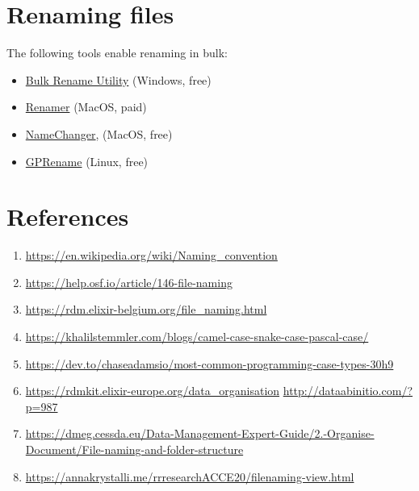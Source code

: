 \documentclass[
  letterpaper,
  DIV=11,
  numbers=noendperiod]{scrreprt}
\providecommand{\tightlist}{%
  \setlength{\itemsep}{0pt}\setlength{\parskip}{0pt}}\usepackage{longtable,booktabs,array}
\begin{document}
\hypertarget{renaming-files}{%
\section*{Renaming files}\label{renaming-files}}


The following tools enable renaming in bulk:

\begin{itemize}
\tightlist
\item
  \href{https://www.bulkrenameutility.co.uk/}{Bulk Rename Utility}
  (Windows, free)
\item
  \href{https://renamer.com/}{Renamer} (MacOS, paid)
\item
  \href{https://mrrsoftware.com/namechanger/}{NameChanger}, (MacOS,
  free)
\item
  \href{https://gprename.sourceforge.net/}{GPRename} (Linux, free)
\end{itemize}

\hypertarget{references-1}{%
\section*{References}\label{references-1}}


\begin{enumerate}
\def\labelenumi{\arabic{enumi}.}
\tightlist
\item
  \url{https://en.wikipedia.org/wiki/Naming_convention}
\item
  \url{https://help.osf.io/article/146-file-naming}
\item
  \url{https://rdm.elixir-belgium.org/file_naming.html}
\item
  \url{https://khalilstemmler.com/blogs/camel-case-snake-case-pascal-case/}
\item
  \url{https://dev.to/chaseadamsio/most-common-programming-case-types-30h9}
\item
  \url{https://rdmkit.elixir-europe.org/data_organisation}
  \url{http://dataabinitio.com/?p=987}
\item
  \url{https://dmeg.cessda.eu/Data-Management-Expert-Guide/2.-Organise-Document/File-naming-and-folder-structure}
\item
  \url{https://annakrystalli.me/rrresearchACCE20/filenaming-view.html}
\end{enumerate}
\end{document}
